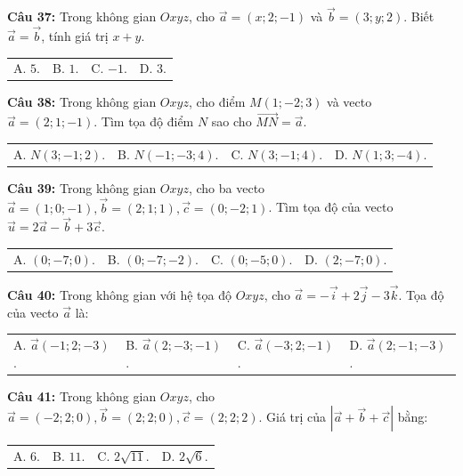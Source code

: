 \documentclass[12pt]{article}
\begin{document}
	\vspace{2mm}
	\noindent \textbf{Câu 37:} Trong không gian $Oxyz$, cho $\vec{a} = (x; 2; -1)$ và $\vec{b} = (3; y; 2)$. Biết $\vec{a} = \vec{b}$, tính giá trị $x + y$. \\
	\noindent
	\begin{tabular}{p{} p{} p{} p{}}
		A. $5$. & B. $1$. & C. $-1$. & D. $3$.
	\end{tabular}
	
	\vspace{2mm}
	\noindent \textbf{Câu 38:} Trong không gian $Oxyz$, cho điểm $M(1; -2; 3)$ và vecto $\vec{a} = (2; 1; -1)$. Tìm tọa độ điểm $N$ sao cho $\vec{MN} = \vec{a}$. \\
	\noindent
	\begin{tabular}{p{} p{} p{} p{}}
		A. $N(3; -1; 2)$. & B. $N(-1; -3; 4)$. & C. $N(3; -1; 4)$. & D. $N(1; 3; -4)$.
	\end{tabular}
	
	\vspace{2mm}
	\noindent \textbf{Câu 39:} Trong không gian $Oxyz$, cho ba vecto $\vec{a} = (1; 0; -1), \vec{b} = (2; 1; 1), \vec{c} = (0; -2; 1)$. Tìm tọa độ của vecto $\vec{u} = 2\vec{a} - \vec{b} + 3\vec{c}$. \\
	\noindent
	\begin{tabular}{p{} p{} p{} p{}}
		A. $(0; -7; 0)$. & B. $(0; -7; -2)$. & C. $(0; -5; 0)$. & D. $(2; -7; 0)$.
	\end{tabular}
	
	\noindent \textbf{Câu 40:} Trong không gian với hệ tọa độ $Oxyz$, cho $\vec{a} = -\vec{i} + 2\vec{j} - 3\vec{k}$. Tọa độ của vecto $\vec{a}$ là: \\
	\noindent
	\begin{tabular}{p{} p{} p{} p{}}
		A. $\vec{a}(-1; 2; -3)$. & B. $\vec{a}(2; -3; -1)$. & C. $\vec{a}(-3; 2; -1)$. & D. $\vec{a}(2; -1; -3)$.
	\end{tabular}
	
	\vspace{2mm}
	\noindent \textbf{Câu 41:} Trong không gian $Oxyz$, cho $\vec{a} = (-2; 2; 0), \vec{b} = (2; 2; 0), \vec{c} = (2; 2; 2)$. Giá trị của $|\vec{a} + \vec{b} + \vec{c}|$ bằng: \\
	\noindent
	\begin{tabular}{p{} p{} p{} p{}}
		A. $6$. & B. $11$. & C. $2\sqrt{11}$. & D. $2\sqrt{6}$.
	\end{tabular}
	
\end{document}
